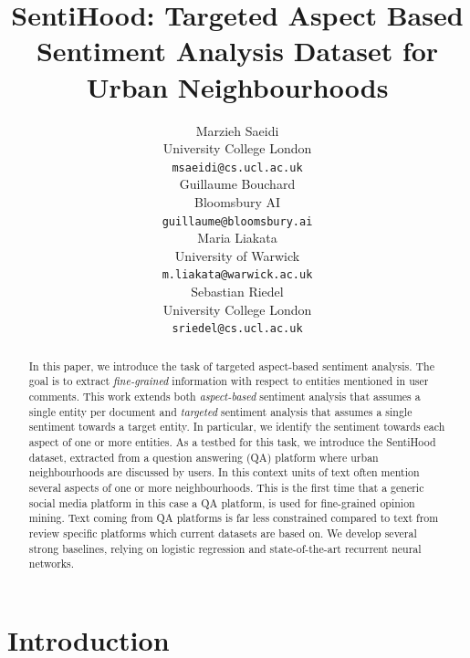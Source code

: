 \documentclass[11pt]{article}
\title{SentiHood: Targeted Aspect Based Sentiment Analysis Dataset for Urban Neighbourhoods}
\author{
  Marzieh Saeidi \\
  University College London \\
  {\tt msaeidi@cs.ucl.ac.uk} \\\And
  Guillaume Bouchard \\
  Bloomsbury AI \\
  {\tt guillaume@bloomsbury.ai} \\
  \AND
  Maria Liakata  \\
  University of Warwick \\
  {\tt m.liakata@warwick.ac.uk} \\\And
  Sebastian Riedel \\
  University College London \\
  {\tt sriedel@cs.ucl.ac.uk} \\
}
\begin{document}
\maketitle

\begin{abstract}
   In this paper, we introduce the task of targeted aspect-based sentiment analysis. The goal is to extract \emph{fine-grained} information with respect to entities mentioned in user comments. This work extends both \emph{aspect-based} sentiment analysis that assumes a single entity per document and \emph{targeted} sentiment analysis that assumes a single sentiment towards a target entity. In particular, we identify the sentiment towards each aspect of one or more entities. As a testbed for this task, we introduce the SentiHood dataset, extracted from a question answering (QA) platform where urban neighbourhoods are discussed by users. In this context units of text often mention several aspects of one or more neighbourhoods. This is the first time that a generic social media platform in this case a QA platform, is used for fine-grained opinion mining. Text coming from QA platforms is far less constrained compared to text from review specific platforms which current datasets are based on. We develop several strong baselines, relying on logistic regression and state-of-the-art recurrent neural networks.
\end{abstract}

\section{Introduction}
\label{intro}
\end{document}

